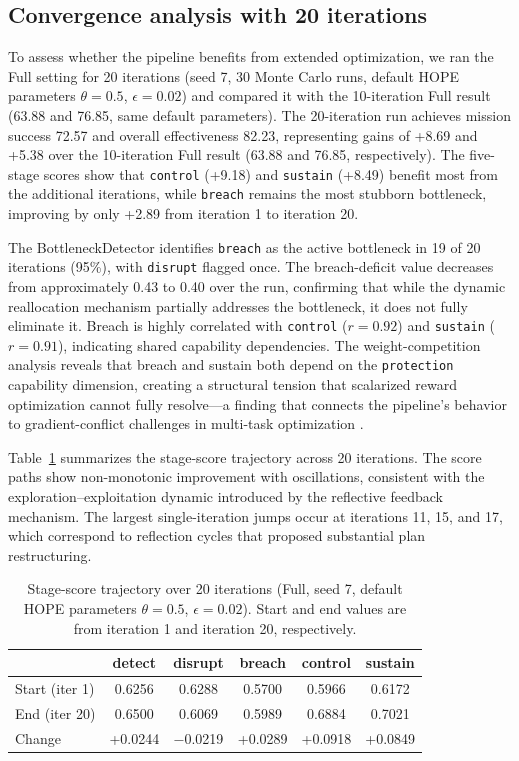\subsection{Convergence analysis with 20 iterations}

To assess whether the pipeline benefits from extended optimization, we ran the Full setting for 20 iterations (seed 7, 30 Monte Carlo runs, default HOPE parameters $\theta=0.5$, $\epsilon=0.02$) and compared it with the 10-iteration Full result (63.88 and 76.85, same default parameters). The 20-iteration run achieves mission success 72.57 and overall effectiveness 82.23, representing gains of +8.69 and +5.38 over the 10-iteration Full result (63.88 and 76.85, respectively). The five-stage scores show that \texttt{control} (+9.18) and \texttt{sustain} (+8.49) benefit most from the additional iterations, while \texttt{breach} remains the most stubborn bottleneck, improving by only +2.89 from iteration 1 to iteration 20.

The BottleneckDetector identifies \texttt{breach} as the active bottleneck in 19 of 20 iterations (95\%), with \texttt{disrupt} flagged once. The breach-deficit value decreases from approximately 0.43 to 0.40 over the run, confirming that while the dynamic reallocation mechanism partially addresses the bottleneck, it does not fully eliminate it. Breach is highly correlated with \texttt{control} ($r=0.92$) and \texttt{sustain} ($r=0.91$), indicating shared capability dependencies. The weight-competition analysis reveals that breach and sustain both depend on the \texttt{protection} capability dimension, creating a structural tension that scalarized reward optimization cannot fully resolve---a finding that connects the pipeline's behavior to gradient-conflict challenges in multi-task optimization \citep{yu2020pcgrad}.

Table~\ref{tab:convergence-stage} summarizes the stage-score trajectory across 20 iterations. The score paths show non-monotonic improvement with oscillations, consistent with the exploration--exploitation dynamic introduced by the reflective feedback mechanism. The largest single-iteration jumps occur at iterations 11, 15, and 17, which correspond to reflection cycles that proposed substantial plan restructuring.

\begin{table}[ht]
\centering
\caption{Stage-score trajectory over 20 iterations (Full, seed 7, default HOPE parameters $\theta=0.5$, $\epsilon=0.02$). Start and end values are from iteration 1 and iteration 20, respectively.}
\label{tab:convergence-stage}
\footnotesize
\setlength{\tabcolsep}{4pt}
\begin{tabular}{lccccc}
\toprule
 & detect & disrupt & breach & control & sustain \\
\midrule
Start (iter 1) & 0.6256 & 0.6288 & 0.5700 & 0.5966 & 0.6172 \\
End (iter 20) & 0.6500 & 0.6069 & 0.5989 & 0.6884 & 0.7021 \\
Change & +0.0244 & $-$0.0219 & +0.0289 & +0.0918 & +0.0849 \\
\bottomrule
\end{tabular}
\setlength{\tabcolsep}{6pt}
\end{table}

